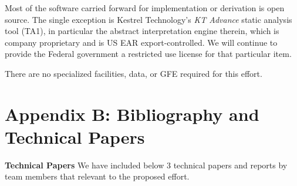 \documentclass[12pt]{dod-blank}
\begin{document}
Most of the software carried forward for implementation or derivation is open source.  The single exception is Kestrel Technology's {\it KT Advance\/} static analysis tool (TA1), in particular the abstract interpretation engine therein, which is company proprietary and is US EAR export-controlled.   
We will continue to provide the Federal government a restricted use license for that particular item.

There are no specialized facilities, data, or GFE required for this effort. 









\section*{Appendix B: Bibliography and Technical Papers}
 

 \textbf{Technical Papers}
 We have included below 3 technical papers and reports by team members that relevant to the proposed effort.
\end{document}
